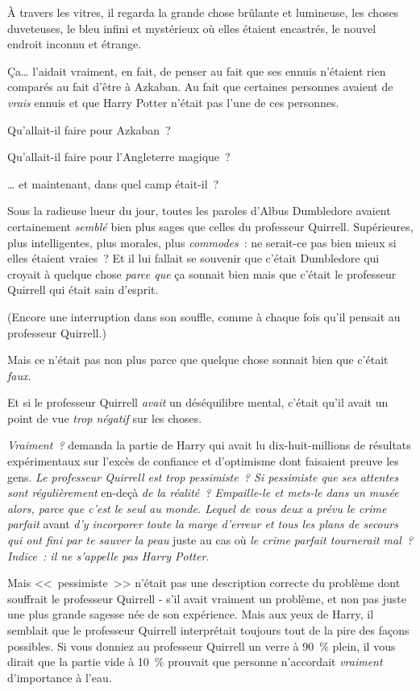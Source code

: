 À travers les vitres, il regarda la grande chose brûlante et lumineuse, les choses duveteuses, le bleu infini et mystérieux où elles étaient encastrés, le nouvel endroit inconnu et étrange.

Ça… l'aidait vraiment, en fait, de penser au fait que ses ennuis n'étaient rien comparés au fait d'être à Azkaban. Au fait que certaines personnes avaient de \emph{vrais} ennuis et que Harry Potter n'était pas l'une de ces personnes.

Qu'allait-il faire pour Azkaban~?

Qu'allait-il faire pour l'Angleterre magique~?

… et maintenant, dans quel camp était-il~?

Sous la radieuse lueur du jour, toutes les paroles d'Albus Dumbledore avaient certainement \emph{semblé} bien plus sages que celles du professeur Quirrell. Supérieures, plus intelligentes, plus morales, plus \emph{commodes}~: ne serait-ce pas bien mieux si elles étaient vraies~? Et il lui fallait se souvenir que c'était Dumbledore qui croyait à quelque chose \emph{parce que} ça sonnait bien mais que c'était le professeur Quirrell qui était sain d'esprit.

(Encore une interruption dans son souffle, comme à chaque fois qu'il pensait au professeur Quirrell.)

Mais ce n'était pas non plus parce que quelque chose sonnait bien que c'était \emph{faux}.

Et si le professeur Quirrell \emph{avait} un déséquilibre mental, c'était qu'il avait un point de vue \emph{trop négatif} sur les choses.

\emph{Vraiment~?} demanda la partie de Harry qui avait lu dix-huit-millions de résultats expérimentaux sur l'excès de confiance et d'optimisme dont faisaient preuve les gens. \emph{Le professeur Quirrell est trop pessimiste~? Si pessimiste que ses attentes sont régulièrement} en-deçà \emph{de la réalité~? Empaille-le et mets-le dans un musée alors, parce que c'est le seul au monde. Lequel de vous deux a prévu le crime parfait} avant \emph{d'y incorporer toute la marge d'erreur et tous les plans de secours qui ont fini par te sauver la peau} juste au cas où \emph{le crime parfait tournerait mal~? Indice~: il ne s'appelle pas Harry Potter.}

Mais <<~pessimiste~>> n'était pas une description correcte du problème dont souffrait le professeur Quirrell - s'il avait vraiment un problème, et non pas juste une plus grande sagesse née de son expérience. Mais aux yeux de Harry, il semblait que le professeur Quirrell interprétait toujours tout de la pire des façons possibles. Si vous donniez au professeur Quirrell un verre à 90~\% plein, il vous dirait que la partie vide à 10~\% prouvait que personne n'accordait \emph{vraiment} d'importance à l'eau.

